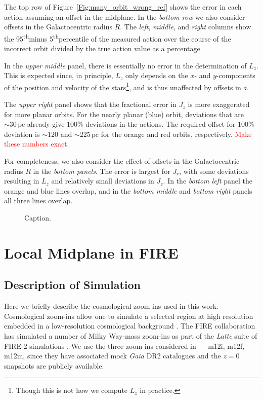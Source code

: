 \documentclass[twocolumn]{aastex62}
\newcommand{\Gus}[1]{\textcolor{red}{#1}}
\newcommand{\pc}{\text{pc}}
\newcommand{\uth}{\textsuperscript{th}}
\begin{document}
The top row of Figure~\ref{Fig:many_orbit_wrong_ref} shows the error in each
action assuming an offset in the midplane. In the {\em bottom row} we also
consider offsets in the Galactocentric radius $R$. The {\em left}, {\em
middle}, and {\em right} columns show the 95\uth minus 5\uth percentile of the
measured action over the course of the incorrect orbit divided by the true
action value as a percentage. 

In the {\em upper middle} panel, there is essentially no error in the
determination of $L_z$. This is expected since, in principle, $L_z$ only
depends on the $x$- and $y$-components of the position and velocity of the
stars\footnote{Though this is not how we compute $L_z$ in practice.}, and is
thus unaffected by offsets in $z$.

The {\em upper right} panel shows that the fractional error in $J_z$ is more
exaggerated for more planar orbits. For the nearly planar (blue) orbit,
deviations that are $\sim30\,\pc$ already give $100\%$ deviations in the
actions. The required offset for $100\%$ deviation is $\sim120$ and
$\sim225\,\pc$ for the orange and red orbits, respectively. \Gus{Make these
numbers exact.}

For completeness, we also consider the effect of offsets in the Galactocentric
radius $R$ in the {\em bottom panels}. The error is largest for $J_r$, with
some deviations resulting in $L_z$ and relatively small deviations in $J_z$.
In the {\em bottom left} panel the orange and blue lines overlap, and in the
{\em bottom middle} and {\em bottom right} panels all three lines overlap.

\begin{figure*}
\caption{Caption.}
\label{fig:many_orbit_wrong_ref}
\end{figure*}

\section{Local Midplane in FIRE} \label{sec:local_fire}
\subsection{Description of Simulation} \label{ssec:cosmozoom}
Here we briefly describe the cosmological zoom-ins used in this work.
Cosmological zoom-ins allow one to simulate a selected region at high
resolution embedded in a low-resolution cosmological background
\citep[e.g.][]{1993ApJ...412..455K,2014MNRAS.437.1894O}. The FIRE
collaboration has simulated a number of Milky Way-mass zoom-ins as part of the
{\em Latte} suite of FIRE-2 simulations
\citep{2016ApJ...827L..23W,2018MNRAS.481.4133G}. We use the three zoom-ins
considered in \citet{2018arXiv180610564S} --- m12i, m12f, m12m, since they
have associated mock {\em Gaia} DR2 catalogues and the $z=0$ snapshots are
publicly available.
\end{document}
